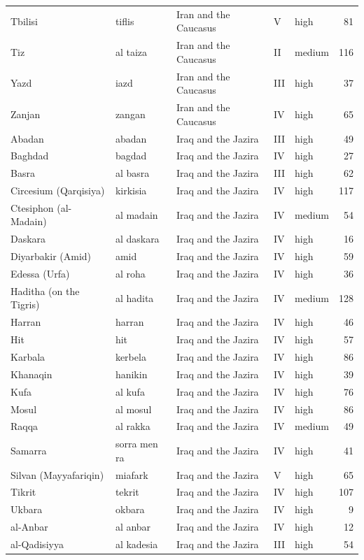\documentclass[11pt,a4paper]{article}
\begin{document}
{\begin{longtable}{p{4.6cm}p{3.0cm}p{3.6cm}llr}
Tbilisi & tiflis & Iran and the Caucasus & V & high & 81\\
Tiz & al taiza & Iran and the Caucasus & II & medium & 116\\
Yazd & iazd & Iran and the Caucasus & III & high & 37\\
Zanjan & zangan & Iran and the Caucasus & IV & high & 65\\
Abadan & abadan & Iraq and the Jazira & III & high & 49\\
Baghdad & bagdad & Iraq and the Jazira & IV & high & 27\\
Basra & al basra & Iraq and the Jazira & III & high & 62\\
Circesium (Qarqisiya) & kirkisia & Iraq and the Jazira & IV & high & 117\\
Ctesiphon (al-Madain) & al madain & Iraq and the Jazira & IV & medium & 54\\
Daskara & al daskara & Iraq and the Jazira & IV & high & 16\\
Diyarbakir (Amid) & amid & Iraq and the Jazira & IV & high & 59\\
Edessa (Urfa) & al roha & Iraq and the Jazira & IV & high & 36\\
Haditha (on the Tigris) & al hadita & Iraq and the Jazira & IV & medium & 128\\
Harran & harran & Iraq and the Jazira & IV & high & 46\\
Hit & hit & Iraq and the Jazira & IV & high & 57\\
Karbala & kerbela & Iraq and the Jazira & IV & high & 86\\
Khanaqin & hanikin & Iraq and the Jazira & IV & high & 39\\
Kufa & al kufa & Iraq and the Jazira & IV & high & 76\\
Mosul & al mosul & Iraq and the Jazira & IV & high & 86\\
Raqqa & al rakka & Iraq and the Jazira & IV & medium & 49\\
Samarra & sorra men ra & Iraq and the Jazira & IV & high & 41\\
Silvan (Mayyafariqin) & miafark & Iraq and the Jazira & V & high & 65\\
Tikrit & tekrit & Iraq and the Jazira & IV & high & 107\\
Ukbara & okbara & Iraq and the Jazira & IV & high & 9\\
al-Anbar & al anbar & Iraq and the Jazira & IV & high & 12\\
al-Qadisiyya & al kadesia & Iraq and the Jazira & III & high & 54\\

\end{longtable}}
\end{document}
